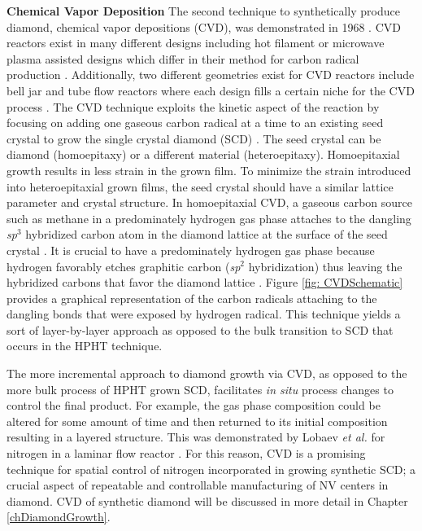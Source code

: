     \noindent\textbf{Chemical Vapor Deposition}
    \newline\indent
    The second technique to synthetically produce diamond, chemical vapor depositions (CVD), was demonstrated in 1968 \cite{Angus1968GrowthDeposition}. CVD reactors exist in many different designs including hot filament or microwave plasma assisted designs which differ in their method for carbon radical production \cite{PaulM2000}. Additionally, two different geometries exist for CVD reactors include bell jar and tube flow reactors where each design fills a certain niche for the CVD process \cite{Dahmen2003}. The CVD technique exploits the kinetic aspect of the reaction by focusing on adding one gaseous carbon radical at a time to an existing seed crystal to grow the single crystal diamond (SCD) \cite{PaulM2000}. The seed crystal can be diamond (homoepitaxy) or a different material (heteroepitaxy). Homoepitaxial growth results in less strain in the grown film. To minimize the strain introduced into heteroepitaxial grown films, the seed crystal should have a similar lattice parameter and crystal structure. In homoepitaxial CVD, a gaseous carbon source such as methane in a predominately hydrogen gas phase attaches to the dangling \textit{sp$^3$} hybridized carbon atom in the diamond lattice at the surface of the seed crystal \cite{PaulM2000,Harris1990MechanismRadicals}. It is crucial to have a predominately hydrogen gas phase because hydrogen favorably etches graphitic carbon (\textit{sp$^2$} hybridization) thus leaving the hybridized carbons that favor the diamond lattice  \cite{PaulM2000}. Figure \ref{fig: CVDSchematic} provides a graphical representation of the carbon radicals attaching to the dangling bonds that were exposed by hydrogen radical. This technique yields a sort of layer-by-layer approach as opposed to the bulk transition to SCD that occurs in the HPHT technique.

    The more incremental approach to diamond growth via CVD, as opposed to the more bulk process of HPHT grown SCD, facilitates \textit{in situ} process changes to control the final product. For example, the gas phase composition could be altered for some amount of time and then returned to its initial composition resulting in a layered structure. This was demonstrated by Lobaev \textit{et al.} for nitrogen in a laminar flow reactor \cite{Lobaev2017}. For this reason, CVD is a promising technique for spatial control of nitrogen incorporated in growing synthetic SCD; a crucial aspect of repeatable and controllable manufacturing of NV centers in diamond. CVD of synthetic diamond will be discussed in more detail in Chapter \ref{chDiamondGrowth}.
	
